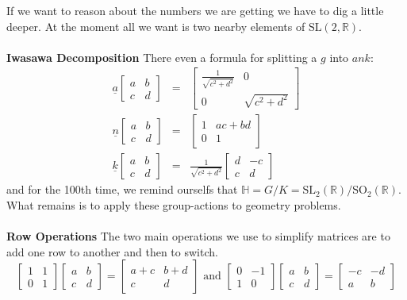 \documentclass[12pt]{article}
\begin{document}
If we want to reason about the numbers we are getting we have to dig a little deeper.  At the moment all we want is two nearby elements of $\text{SL}(2, \mathbb{R})$. \\ \\
\textbf{Iwasawa Decomposition} There even a formula for splitting a $g$ into $ank$:
\begin{eqnarray*}
\underline{a}\left[ \begin{array}{cc} a & b \\ c & d \end{array} \right]  &=& 
\left[ \begin{array}{cc} \frac{1}{\sqrt{c^2+d^2}} & 0 \\ 0 & \sqrt{c^2 + d^2} \end{array} \right]  \\
\underline{n}\left[ \begin{array}{cc} a & b \\ c & d \end{array} \right]  &=& 
\left[ \begin{array}{cc} 1 & ac+bd \\ 0 & 1 \end{array} \right]  \\
\underline{k}\left[ \begin{array}{cc} a & b \\ c & d \end{array} \right]  &=& 
\frac{1}{\sqrt{c^2 + d^2}}\left[ \begin{array}{rr} d & -c \\ c & d \end{array} \right]  
\end{eqnarray*}
and for the 100th time, we remind ourselfs that $\mathbb{H} = G/K = \text{SL}_2(\mathbb{R})/\text{SO}_2(\mathbb{R})$.  What remains is to apply these group-actions to geometry problems. \\ \\
\textbf{Row Operations} The two main operations we use to simplify matrices are to add one row to another and then to switch.
$$ \left[ \begin{array}{cc} 1 & 1 \\ 0 & 1 \end{array} \right]\left[ \begin{array}{cc} a & b \\ c & d \end{array} \right]
= \left[ \begin{array}{rr} a+c & b+d \\ c & d \end{array} \right] \text{ and }
\left[ \begin{array}{rr} 0 & -1 \\ 1 & 0 \end{array} \right]\left[ \begin{array}{cc} a & b \\ c & d \end{array} \right]
= \left[ \begin{array}{rr} -c & -d \\ a & b \end{array} \right]$$
\end{document}
